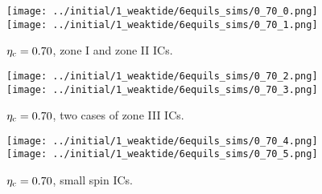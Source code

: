 \documentclass[11pt,
        usenames, %
        dvipsnames %
    ]{article}
\begin{document}
\begin{figure}
    \centering
    \texttt{[image: ../initial/1\_weaktide/6equils\_sims/0\_70\_0.png]}
    \texttt{[image: ../initial/1\_weaktide/6equils\_sims/0\_70\_1.png]}
    \caption{$\eta_{\rm c} = 0.70$, zone I and zone II ICs.}
\end{figure}
\begin{figure}
    \centering
    \texttt{[image: ../initial/1\_weaktide/6equils\_sims/0\_70\_2.png]}
    \texttt{[image: ../initial/1\_weaktide/6equils\_sims/0\_70\_3.png]}
    \caption{$\eta_{\rm c} = 0.70$, two cases of zone III ICs.}
\end{figure}
\begin{figure}
    \centering
    \texttt{[image: ../initial/1\_weaktide/6equils\_sims/0\_70\_4.png]}
    \texttt{[image: ../initial/1\_weaktide/6equils\_sims/0\_70\_5.png]}
    \caption{$\eta_{\rm c} = 0.70$, small spin ICs.}
\end{figure}
\end{document}
